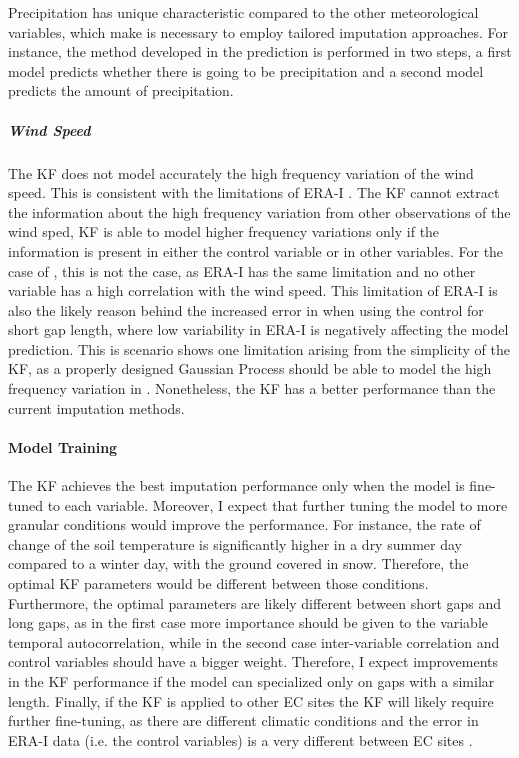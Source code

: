 \documentclass{article}
\begin{document}
Precipitation has unique characteristic compared to the other meteorological variables, which make is necessary to employ tailored imputation approaches. For instance, the method developed in \textcite{chivers_imputation_2020} the prediction is performed in two steps, a first model predicts whether there is going to be precipitation and a second model predicts the amount of precipitation. 

\subparagraph{Wind Speed} The KF does not model accurately the high frequency variation of the wind speed. This is consistent with the limitations of ERA-I \cite{vuichard_filling_2015}. The KF cannot extract the information about the high frequency variation from other observations of the wind sped, KF is able to model higher frequency variations only if the information is present in either the control variable or in other variables. For the case of , this is not the case, as ERA-I has the same limitation and no other variable has a high correlation with the wind speed. This limitation of ERA-I is also the likely reason behind the increased error in  when using the control for short gap length, where low variability in ERA-I is negatively affecting the model prediction.
This is scenario shows one limitation arising from the simplicity of the KF, as a properly designed Gaussian Process should be able to model the high frequency variation in . Nonetheless, the KF has a better performance than the current imputation methods. 

\paragraph{Model Training} The KF achieves the best imputation performance only when the model is fine-tuned to each variable. 
Moreover, I expect that further tuning the model to more granular conditions would improve the performance.
For instance, the rate of change of the soil temperature is significantly  higher in a dry summer day compared to a winter day, with the ground covered in snow. Therefore, the optimal KF parameters would be different between those conditions.
Furthermore, the optimal parameters are likely different between short gaps and long gaps, as in the first case more importance should be given to the variable temporal autocorrelation, while in the second case inter-variable correlation and control variables should have a bigger weight. Therefore, I expect improvements in the KF performance if the model can specialized only on gaps with a similar length.
Finally, if the KF is applied to other EC sites the KF will likely require further fine-tuning, as there are different climatic conditions and the error in ERA-I data (i.e. the control variables) is a very different between EC sites \cite{vuichard_filling_2015}. 
\end{document}
